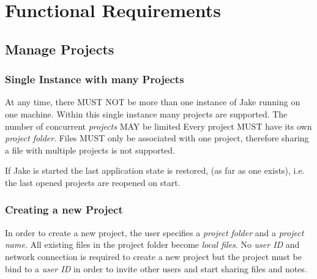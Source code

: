 \section{Functional Requirements}

\subsection{Manage Projects}
\subsubsection{Single Instance with many Projects}
At any time, there MUST NOT be more than one instance of Jake running on one machine. 
Within this single instance many projects are supported. The number of concurrent \emph{projects} MAY be limited
Every project MUST have its own \emph{project folder}. Files MUST only be associated with one project, therefore sharing a file with multiple projects is not supported.

If Jake is started the last application state is restored, (as far as one exists), i.e. the last opened projects are reopened on start. 

\subsubsection{Creating a new Project}
In order to create a new project, the user specifies a \emph{project folder} and a \emph{project name}. All existing files in the project folder become \emph{local files}. No \emph{user ID} and network connection is required to create a new project but the project must be bind to a \emph{user ID} in order to invite other users and start sharing files and notes.

